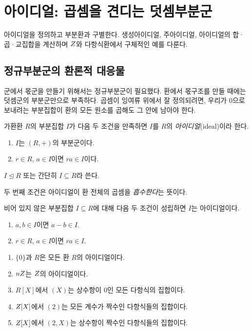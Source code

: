 \section{아이디얼: 곱셈을 견디는 덧셈부분군}
\label{sec:ring-ideals}

\begin{learninggoal}
아이디얼을 정의하고 부분환과 구별한다. 생성아이디얼, 주아이디얼, 아이디얼의 합·곱·교집합을 계산하며 $Z$와 다항식환에서 구체적인 예를 다룬다.
\end{learninggoal}

\subsection{정규부분군의 환론적 대응물}

군에서 몫군을 만들기 위해서는 정규부분군이 필요했다. 환에서 몫구조를 만들 때에는 덧셈군의 부분군만으로 부족하다. 곱셈이 잉여류 위에서 잘 정의되려면, 우리가 $0$으로 보내려는 부분집합이 환의 모든 원소를 곱해도 그 안에 남아야 한다.

\begin{definition}[아이디얼]
가환환 $R$의 부분집합 $I$가 다음 두 조건을 만족하면 $I$를 $R$의 \emph{아이디얼}(ideal)이라 한다.
\begin{enumerate}[label=(I\arabic*)]
  \item $I$는 $(R,+)$의 부분군이다.
  \item $r\in R$, $a\in I$이면 $ra\in I$이다.
\end{enumerate}
$I\trianglelefteq R$ 또는 간단히 $I\subseteq R$라 쓴다.
\end{definition}

두 번째 조건은 아이디얼이 환 전체의 곱셈을 \emph{흡수한다}는 뜻이다.

\begin{proposition}
비어 있지 않은 부분집합 $I\subseteq R$에 대해 다음 두 조건이 성립하면 $I$는 아이디얼이다.
\begin{enumerate}[label=(\roman*)]
  \item $a,b\in I$이면 $a-b\in I$.
  \item $r\in R$, $a\in I$이면 $ra\in I$.
\end{enumerate}
\end{proposition}

\begin{example}
\begin{enumerate}[label=(\alph*)]
  \item $\{0\}$과 $R$은 모든 환 $R$의 아이디얼이다.
  \item $nZ$는 $Z$의 아이디얼이다.
  \item $R[X]$에서 $(X)$는 상수항이 $0$인 모든 다항식의 집합이다.
  \item $Z[X]$에서 $(2)$는 모든 계수가 짝수인 다항식들의 집합이다.
  \item $Z[X]$에서 $(2,X)$는 상수항이 짝수인 다항식들의 집합이다.
\end{enumerate}
\end{example}

